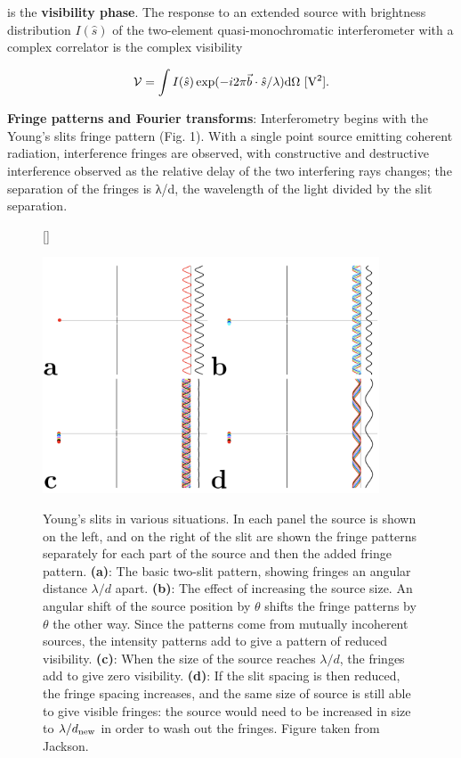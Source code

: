\documentclass[a4paper,10pt]{article}
\begin{document}
{\noindent}is the \textbf{visibility phase}. The response to an extended source with brightness distribution $I(\hat{s})$ of the two-element quasi-monochromatic interferometer with a complex correlator is the complex visibility

\begin{align*}
    \mathcal{V} = \int I(\hat{s}) \exp (-i2\pi\vec{b}\cdot\hat{s}/\lambda){\rm d}\Omega ~ [{\rm V^2}].
\end{align*}

{\noindent}\textbf{Fringe patterns and Fourier transforms}: Interferometry begins with the Young’s slits fringe pattern (Fig. 1). With a single point source emitting coherent radiation, interference fringes are observed, with constructive and destructive interference observed as the relative delay of the two interfering rays changes; the separation of the fringes is λ/d, the wavelength of the light divided by the slit separation.

\begin{figure}[t]
    [\FBwidth]
    {\caption{\footnotesize{Young's slits in various situations. In each panel the source is shown on the left, and on the right of the slit are shown the fringe patterns separately for each part of the source and then the added fringe pattern. \textbf{(a)}: The basic two-slit pattern, showing fringes an angular distance $\lambda/d$ apart. \textbf{(b)}: The effect of increasing the source size. An angular shift of the source position by $\theta$ shifts the fringe patterns by $\theta$ the other way. Since the patterns come from mutually incoherent sources, the intensity patterns add to give a pattern of reduced visibility. \textbf{(c)}: When the size of the source reaches $\lambda/d$, the fringes add to give zero visibility. \textbf{(d)}: If the slit spacing is then reduced, the fringe spacing increases, and the same size of source is still able to give visible fringes: the source would need to be increased in size to $\lambda/d_{\rm new}$ in order to wash out the fringes. Figure taken from Jackson.}}
    \label{fig:slitpatterns}}
    {\includegraphics[width=10cm]{figures/SlitPatterns.png}}
\end{figure}
\end{document}
